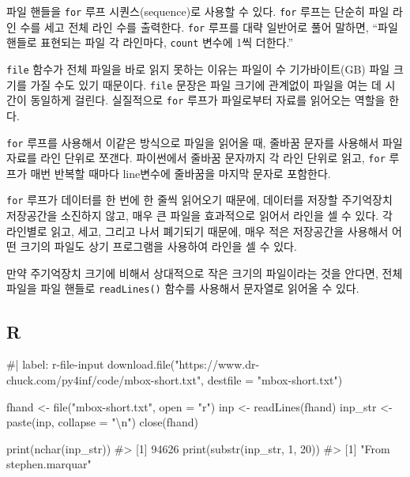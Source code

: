 \documentclass[
  letterpaper,
]{book}
\newenvironment{Shaded}{\begin{snugshade}}{\end{snugshade}}
\newcommand{\NormalTok}[1]{\textcolor[rgb]{0.00,0.23,0.31}{#1}}
\begin{document}
파일 핸들을 \texttt{for} 루프 시퀀스(sequence)로 사용할 수 있다.
\texttt{for} 루프는 단순히 파일 라인 수를 세고 전체 라인 수를 출력한다.
\texttt{for} 루프를 대략 일반어로 풀어 말하면, ``파일 핸들로 표현되는
파일 각 라인마다, \texttt{count} 변수에 1씩 더한다.''

\texttt{file} 함수가 전체 파일을 바로 읽지 못하는 이유는 파일이 수
기가바이트(GB) 파일 크기를 가질 수도 있기 때문이다. \texttt{file} 문장은
파일 크기에 관계없이 파일을 여는 데 시간이 동일하게 걸린다. 실질적으로
\texttt{for} 루프가 파일로부터 자료를 읽어오는 역할을 한다.

\texttt{for} 루프를 사용해서 이같은 방식으로 파일을 읽어올 때, 줄바꿈
문자를 사용해서 파일 자료를 라인 단위로 쪼갠다. 파이썬에서 줄바꿈
문자까지 각 라인 단위로 읽고, \texttt{for} 루프가 매번 반복할 때마다
line변수에 줄바꿈을 마지막 문자로 포함한다.

\texttt{for} 루프가 데이터를 한 번에 한 줄씩 읽어오기 때문에, 데이터를
저장할 주기억장치 저장공간을 소진하지 않고, 매우 큰 파일을 효과적으로
읽어서 라인을 셀 수 있다. 각 라인별로 읽고, 세고, 그리고 나서 폐기되기
때문에, 매우 적은 저장공간을 사용해서 어떤 크기의 파일도 상기 프로그램을
사용하여 라인을 셀 수 있다.

만약 주기억장치 크기에 비해서 상대적으로 작은 크기의 파일이라는 것을
안다면, 전체 파일을 파일 핸들로 \texttt{readLines()} 함수를 사용해서
문자열로 읽어올 수 있다.

\subsection{R}

\begin{Shaded}
\begin{Highlighting}[]
\NormalTok{\#| label: r{-}file{-}input}
\NormalTok{download.file("https://www.dr{-}chuck.com/py4inf/code/mbox{-}short.txt",}
\NormalTok{              destfile = "mbox{-}short.txt")}

\NormalTok{fhand \textless{}{-} file("mbox{-}short.txt", open = "r")}
\NormalTok{inp \textless{}{-} readLines(fhand)}
\NormalTok{inp\_str \textless{}{-} paste(inp, collapse = "\textbackslash{}n")}
\NormalTok{close(fhand)}

\NormalTok{print(nchar(inp\_str))}
\NormalTok{\#\textgreater{} [1] 94626}
\NormalTok{print(substr(inp\_str, 1, 20))}
\NormalTok{\#\textgreater{} [1] "From stephen.marquar"}
\end{Highlighting}
\end{Shaded}
\end{document}
